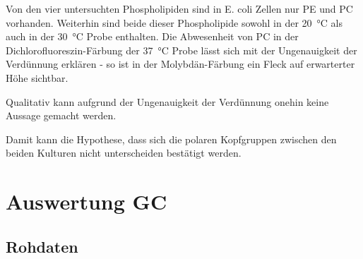 \documentclass[a4paper,english]{scrreprt}
\begin{document}
Von den vier untersuchten Phospholipiden sind in E. coli Zellen nur PE und PC
vorhanden. Weiterhin sind beide dieser Phospholipide sowohl in der
\SI{20}{\celsius} als auch in der \SI{30}{\celsius} Probe enthalten. Die
Abwesenheit von PC in der Dichlorofluoreszin-Färbung der \SI{37}{\celsius}
Probe lässt sich mit der Ungenauigkeit der Verdünnung erklären - so ist in der
Molybdän-Färbung ein Fleck auf erwarterter Höhe sichtbar.

Qualitativ kann aufgrund der Ungenauigkeit der Verdünnung onehin keine Aussage
gemacht werden.

Damit kann die Hypothese, dass sich die polaren Kopfgruppen zwischen den beiden
Kulturen nicht unterscheiden bestätigt werden.

\chapter{Auswertung GC}

\section{Rohdaten}
\end{document}
